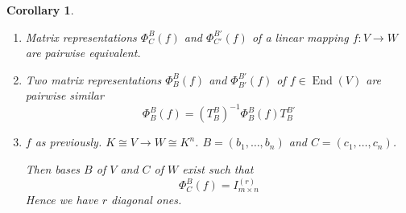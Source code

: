 \documentclass[a4paper,landscape,twocolumn]{article}
\newtheorem{cor}{Corollary}
\DeclareMathOperator\End{End} %
\begin{document}
\begin{cor}
  \begin{enumerate}
    \item
      Matrix representations $\Phi_C^B(f)$ and $\Phi_{C'}^{B'}(f)$ of a linear mapping
      $f: V \to W$ are pairwise equivalent.
    \item
      Two matrix representations $\Phi_B^B(f)$ and $\Phi_{B'}^{B'}(f)$ of $f \in \End(V)$
      are pairwise similar
      \[ \Phi_B^B(f) = \left(T_B^B\right)^{-1} \Phi_B^{B}(f) T_B^{B'} \]
    \item
      $f$ as previously. $K \cong V \to W \cong K^n$. $B = (b_1, \ldots, b_n)$ and $C = (c_1, \ldots, c_n)$.

      Then bases $B$ of $V$ and $C$ of $W$ exist such that
      \[ \Phi_C^B(f) = I_{m \times n}^{(r)} \]
      Hence we have $r$ diagonal ones.
  \end{enumerate}
\end{cor}

\clearpage
\begin{otherlanguage}{ngerman}
\printindex[German]
\end{otherlanguage}
\printindex[English]
\end{document}
